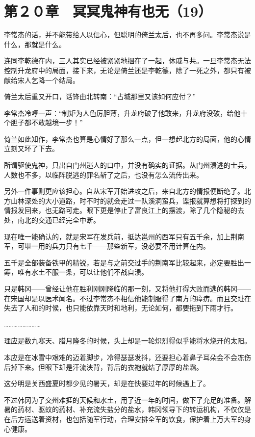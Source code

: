 \section{第２０章　冥冥鬼神有也无（19）}

李常杰的话，并不能带给人以信心，但聪明的倚兰太后，也不再多问。李常杰说是什么，那就是什么。

连同李乾德在内，三人其实已经被紧紧地捆在了一起，休戚与共。一旦李常杰无法控制升龙府中的局面，接下来，无论是倚兰还是李乾德，除了一死之外，都只有被献给宋人乞降一个结局。

倚兰太后重又开口，话锋由北转南：“占城那里又该如何应付？”

李常杰冷哼一声：“制矩为人色厉胆薄，升龙府破了他敢来，升龙府没破，给他十个胆子都不敢越境一步！”

倚兰如此知作，李常杰也算是心情好了那么一点，但一想起北方的局面，他的心情立刻又坏了下去。

所谓驱使鬼神，只出自门州逃人的口中，并没有确实的证据。从门州溃逃的士兵，人数也不多，以临阵脱逃的罪名斩了之后，也没有怎么流传出来。

另外一件事则更应该担心。自从宋军开始进攻之后，来自北方的情报便断绝了。北方山林深处的大小道路，时不时的就会走过一队溪洞蛮兵，谍报就算想将打探到的情报发回来，也无路可走。眼下更是停止了富良江上的摆渡，除了几个隐秘的去处，南北的交通已经完全中断。

现在唯一能确认的，就是宋军在发兵前，抵达邕州的西军只有五千余，加上荆南军，可堪一用的兵力只有七千——那些新军，没必要不用计算在内。

五千是全部装备铁甲的精锐，若是与之前交过手的荆南军比较起来，必定要胜出一筹，唯有水土不服一条，可以让他们不战自溃。

只是韩冈——曾经让他在胜利刚刚降临的那一刻，又将他打得大败而逃的韩冈——在宋国却是以医术闻名。不过李常杰不相信他能制服得了南方的瘴疠。而且交趾在失去了人和的时候，也只能依靠天时和地利，无论如何，都要拖到下雨才行。

……………………

理应是数九寒天、腊月隆冬的时候，头上却是一轮炽烈得似乎能将水烧开的太阳。

本应是在冰雪中艰难的迈着脚步，冷得瑟瑟发抖，还要担心着鼻子耳朵会不会冻伤后掉下来。但眼下却是汗流浃背，背后的衣袍就结了厚厚的盐霜。

这分明是关西盛夏时都少见的暑天，却是在快要过年的时候遇上了。

不过韩冈为了交州难捱的天候和水土，用了近一年的时间，做下了充足的准备。解暑的药材、驱蚊的药材、补充流失盐分的盐水，韩冈领导下的转运机构，不仅仅是在后方运送着资材，也包括随军行动，合理安排全军的饮食，保护着上万大军的身心健康。

